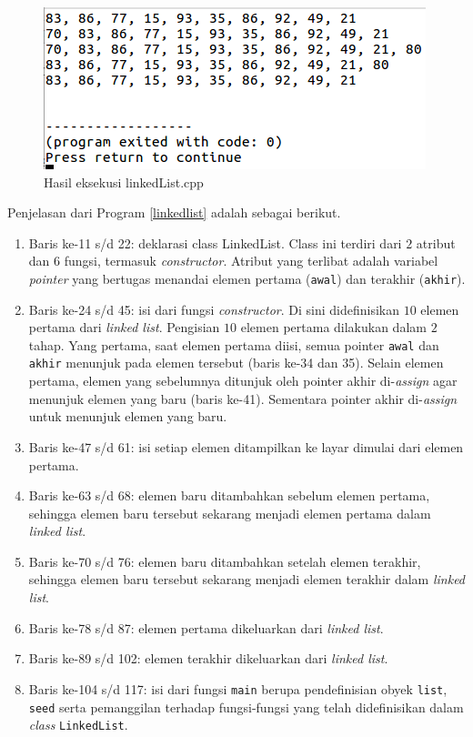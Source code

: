 \scriptsize

\normalsize

\begin{figure}[H]
\centering
\includegraphics[scale=.5]{pics/hasillinkedlist.png}
\caption{Hasil eksekusi linkedList.cpp}
\label{fig:linkedList}
\end{figure}

Penjelasan dari Program \ref{linkedlist} adalah sebagai berikut.
\begin{enumerate}
\item Baris ke-11 s/d 22: deklarasi class LinkedList. Class ini terdiri dari $2$ atribut dan $6$ fungsi, termasuk \textit{constructor}. Atribut yang terlibat adalah variabel \textit{pointer} yang bertugas menandai elemen pertama (\texttt{awal}) dan terakhir (\texttt{akhir}).
\item Baris ke-24 s/d 45: isi dari fungsi \textit{constructor}. Di sini didefinisikan $10$ elemen pertama dari \textit{linked list}. Pengisian $10$ elemen pertama dilakukan dalam $2$ tahap. Yang pertama, saat elemen pertama diisi, semua pointer \texttt{awal} dan \texttt{akhir} menunjuk pada elemen tersebut (baris ke-34 dan 35). Selain elemen pertama, elemen yang sebelumnya ditunjuk oleh pointer akhir di-\textit{assign} agar menunjuk elemen yang baru (baris ke-41). Sementara pointer akhir di-\textit{assign} untuk menunjuk elemen yang baru.
\item Baris ke-47 s/d 61: isi setiap elemen ditampilkan ke layar dimulai dari elemen pertama.
\item Baris ke-63 s/d 68: elemen baru ditambahkan sebelum elemen pertama, sehingga elemen baru tersebut sekarang menjadi elemen pertama dalam \textit{linked list}.
\item Baris ke-70 s/d 76: elemen baru ditambahkan setelah elemen terakhir, sehingga elemen baru tersebut sekarang menjadi elemen terakhir dalam \textit{linked list}.
\item Baris ke-78 s/d 87: elemen pertama dikeluarkan dari \textit{linked list}.
\item Baris ke-89 s/d 102: elemen terakhir dikeluarkan dari \textit{linked list}.
\item Baris ke-104 s/d 117: isi dari fungsi \texttt{main} berupa pendefinisian obyek \texttt{list}, \texttt{seed} serta pemanggilan terhadap fungsi-fungsi yang telah didefinisikan dalam \textit{class} \texttt{LinkedList}.
\end{enumerate}




